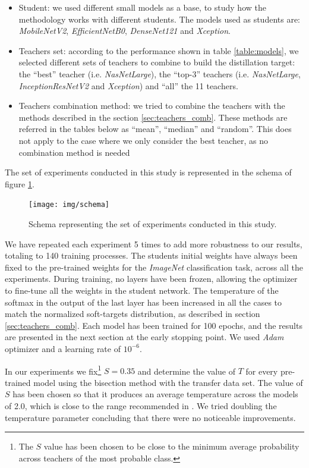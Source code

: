 \documentclass{elsarticle}
\begin{document}
	\begin{itemize}
		\item Student: we used different small models as a base, to study how the methodology works with different students. The models used as students are: \textit{MobileNetV2}, \textit{EfficientNetB0}, \textit{DenseNet121} and \textit{Xception}.
		\item Teachers set: according to the performance shown in table \ref{table:models}, we selected different sets of teachers to combine to build the distillation target: the ``best'' teacher (i.e. \textit{NasNetLarge}), the ``top-3'' teachers (i.e. \textit{NasNetLarge}, \textit{InceptionResNetV2} and \textit{Xception}) and ``all'' the 11 teachers.
		\item Teachers combination method: we tried to combine the teachers with the methods described in the section \ref{sec:teachers_comb}. These methods are referred in the tables below as ``mean'', ``median'' and ``random''. This does not apply to the case where we only consider the best teacher, as no combination method is needed
	\end{itemize}

	The set of experiments conducted in this study is represented in the schema of figure \ref{fig:schema}.

\begin{figure}[h!]
	\centering
	\texttt{[image: img/schema]}
	\caption{Schema representing the set of experiments conducted in this study.}
	\label{fig:schema}
\end{figure}


	We have repeated each experiment 5 times to add more robustness to our results, totaling to 140 training processes. The students initial weights have always been fixed to the pre-trained weights for the \textit{ImageNet} classification task, across all the experiments. During training, no layers have been frozen, allowing the optimizer to fine-tune all the weights in the student network. The temperature of the softmax in the output of the last layer has been increased in all the cases to match the normalized soft-targets distribution, as described in section \ref{sec:teachers_comb}.  Each model has been trained for 100 epochs, and the results are presented in the next section at the early stopping point. We used \textit{Adam} optimizer \citep{Kingma14} and a learning rate of $10^{-6}$.

	 In our experiments we fix\footnote{The $S$ value has been chosen to be close to the minimum average probability across teachers of the most probable class.} $S=0.35$ and determine the value of $T$ for every pre-trained model using the bisection method with the transfer data set. The value of $S$ has been chosen so that it produces an average temperature across the models of 2.0, which is close to the range recommended in \citep{hinton2015}. We tried doubling the temperature parameter concluding that there were no noticeable improvements.
\end{document}
